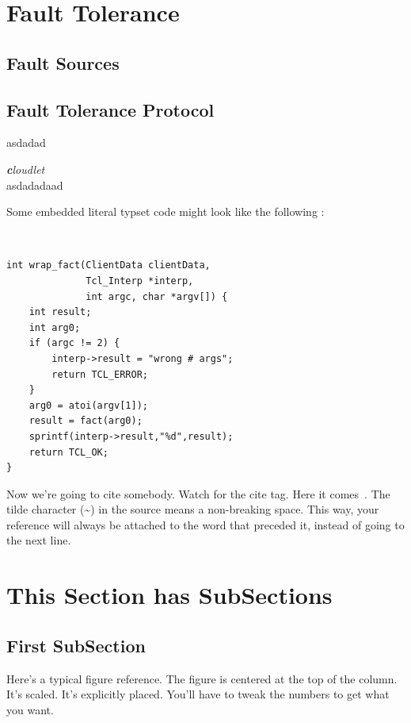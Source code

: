 \documentclass[letterpaper,twocolumn,10pt]{article}
\begin{document}
\section{Fault Tolerance}

\subsection{Fault Sources}

\subsection{Fault Tolerance Protocol}
\begin{flushleft}
asdadad

\emph{\textbf cloudlet}\\
asdadadaad
\end{flushleft}





Some embedded literal typset code might 
look like the following :


{\tt \small
\begin{verbatim}
int wrap_fact(ClientData clientData,
              Tcl_Interp *interp,
              int argc, char *argv[]) {
    int result;
    int arg0;
    if (argc != 2) {
        interp->result = "wrong # args";
        return TCL_ERROR;
    }
    arg0 = atoi(argv[1]);
    result = fact(arg0);
    sprintf(interp->result,"%d",result);
    return TCL_OK;
}
\end{verbatim}
}

Now we're going to cite somebody.  Watch for the cite tag.
Here it comes~\cite{Chaum1981,Diffie1976}.  The tilde character (\~{})
in the source means a non-breaking space.  This way, your reference will
always be attached to the word that preceded it, instead of going to the
next line.

\section{This Section has SubSections}
\subsection{First SubSection}

Here's a typical figure reference.  The figure is centered at the
top of the column.  It's scaled.  It's explicitly placed.  You'll
have to tweak the numbers to get what you want.\\
\end{document}
